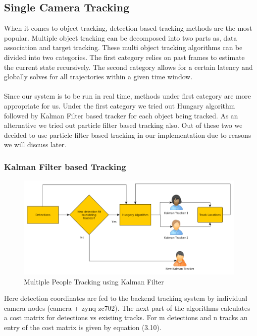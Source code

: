 \documentclass[12pt,a4paper]{report}
\begin{document}
\subsection{Single Camera Tracking}
When it comes to object tracking, detection based tracking methods are the most popular. Multiple object tracking can be decomposed into two parts as, data association and target tracking. These multi object tracking algorithms can be divided into two categories. The first category relies on past frames to estimate the current state recursively. The second category allows for a certain latency and globally solves for all trajectories within a given time window. \\\\
Since our system is to be run in real time, methods under first category are more appropriate for us. Under the first category we tried out Hungary algorithm followed by Kalman Filter based tracker for each object being tracked. As an alternative we tried out particle filter based tracking also. Out of these two we decided to use particle filter based tracking in our implementation due to reasons we will discuss later. 

\subsubsection{Kalman Filter based Tracking}

\begin{figure}[H]
\includegraphics[width=\textwidth]{kalman_hungary_tracker.png}
\centering
\caption{Multiple People Tracking using Kalman Filter}
\label{flask}
\end{figure}
Here detection coordinates are fed to the backend tracking system by individual camera nodes (camera + zynq zc702). The next part of the algorithms calculates a cost matrix for detections vs existing tracks. For m detections and n tracks an entry of the cost matrix is given by equation (3.10).
\end{document}
